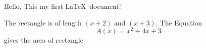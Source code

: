 \documentclass{article}
\begin{document}
Hello, This my first \LaTeX\ document!

The rectangle is of length $(x+2)$ and $(x+3)$.
The Equation $${A(x)=x^2+4x+3}$$ gives the area of rectangle
\end{document}
